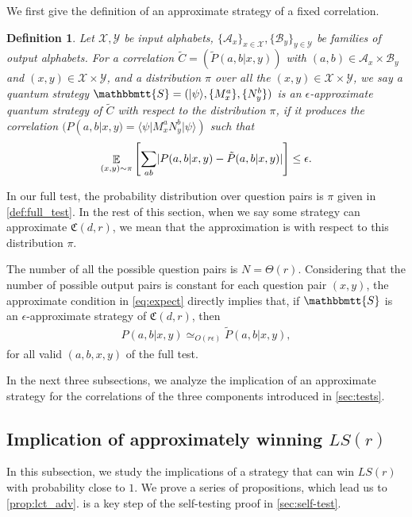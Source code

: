 \documentclass[11pt,letterpaper]{article}
\newcommand{\ket}[1]{|#1\rangle}
\newcommand{\bra}[1]{\langle#1|}
\DeclarePairedDelimiter{\abs}{\lvert}{\rvert}
\DeclareMathOperator*{\E}{\mathbb{E}}
\newcommand{\calX}{\mathcal{X}}
\newcommand{\calY}{\mathcal{Y}}
\newcommand{\calA}{\mathcal{A}}
\newcommand{\calB}{\mathcal{B}}
\newcommand{\1}{\mathbb{1}}
\newcommand{\LS}{LS}
\newcommand{\fC}{\mathfrak{C}}
\newcommand{\bS}{\mathbbmtt{S}}
\newcommand{\pr}[2]{P(#1|#2)}
\newcommand{\tpr}[2]{\tilde{P}(#1|#2)}
\newcommand{\ep}{\epsilon}
\newcommand{\appd}[1]{\simeq_{#1}}
\newtheorem{definition}[theorem]{Definition}
\theoremstyle{definition}
\begin{document}
We first give the definition of an approximate strategy of a fixed correlation.
\begin{definition}
    Let $\calX, \calY$ be input alphabets,
    $\{\calA_x\}_{x \in \calX}, \{\calB_y\}_{y \in \calY}$
    be families of output alphabets.
	For a correlation $\tilde{C} = (\tpr{a,b}{x,y})$
	with $(a,b) \in \calA_x \times \calB_y$ and $(x,y) \in \calX \times \calY$,
	and a distribution $\pi$ over all the $(x,y) \in \calX \times \calY$,
	we say a quantum strategy $\bS = (\ket{\psi}, \{M_x^a\}, \{N_y^b\})$
	is an $\ep$-approximate quantum strategy of $\tilde{C}$
	with respect to the distribution $\pi$, 
	if it produces the correlation
	$( \pr{a,b}{x,y} = \bra{\psi} M_x^a N_y^b \ket{\psi} )$ such that
	\begin{align}
	\label{eq:expect}
	\E_{(x,y) \sim \pi} \left[\sum_{ab} \abs{\pr{a,b}{x,y} - \tpr{a,b}{x,y}}\right] \leq \ep.
	\end{align}
\end{definition}
In our full test, the probability distribution over question pairs is $\pi$ given in 
\cref{def:full_test}.
In the rest of this section, when we say some strategy can approximate
$\fC(d,r)$, we mean that the approximation is with respect to 
this distribution $\pi$.


The number of all the possible question pairs is 
$N = \Theta(r)$.
Considering that
the number of possible output pairs is constant for each question pair $(x,y)$, 
the approximate condition in \cref{eq:expect} directly implies that, if $\bS$ is an $\ep$-approximate strategy
of $\fC(d,r)$, then
\begin{align*}
    \pr{a,b}{x,y} \appd{O(r\ep)} \tpr{a,b}{x,y},
\end{align*}
for all valid $(a,b,x,y)$ of the full test.

In the next three subsections, we analyze the implication of an approximate strategy 
for the correlations of the 
three components introduced in \cref{sec:tests}.

\subsection{Implication of approximately winning $\LS(r)$}
\label{sec:imp_lct}
In this subsection, we study the implications of a strategy that can win $\LS(r)$ with probability close to $1$. We prove a series of 
propositions, which lead us to \cref{prop:lct_adv}.
 is a key step of the self-testing proof in \cref{sec:self-test}.
\end{document}
